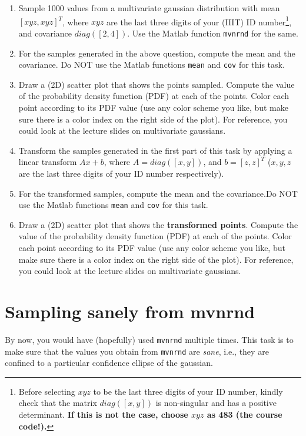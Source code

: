 \documentclass{article}
\begin{document}
\begin{enumerate}
\item Sample 1000 values from a multivariate gaussian distribution with mean $\left[xyz, xyz\right]^T$, where $xyz$ are the last three digits of your (IIIT) ID number\footnote{Before selecting $xyz$ to be the last three digits of your ID number, kindly check that the matrix $diag([x, y])$ is non-singular and has a positive determinant. \textbf{If this is not the case, choose $xyz$ as 483 (the course code!).}}, and covariance $diag([2, 4])$. Use the Matlab function \texttt{mvnrnd} for the same.
\item For the samples generated in the above question, compute the mean and the covariance. Do NOT use the Matlab functions \texttt{mean} and \texttt{cov} for this task.
\item Draw a (2D) scatter plot that shows the points sampled. Compute the value of the probability density function (PDF) at each of the points. Color each point according to its PDF value (use any color scheme you like, but make sure there is a color index on the right side of the plot). For reference, you could look at the lecture slides on multivariate gaussians.
\item Transform the samples generated in the first part of this task by applying a linear transform $Ax + b$, where $A = diag(\left[x, y\right])$, and $b = [z, z]^T$ ($x,y,z$ are the last three digits of your ID number respectively).
\item For the transformed samples, compute the mean and the covariance.Do NOT use the Matlab functions \texttt{mean} and \texttt{cov} for this task.
\item Draw a (2D) scatter plot that shows the \textbf{transformed points}. Compute the value of the probability density function (PDF) at each of the points. Color each point according to its PDF value (use any color scheme you like, but make sure there is a color index on the right side of the plot). For reference, you could look at the lecture slides on multivariate gaussians.
\end{enumerate}

\section{Sampling sanely from mvnrnd}

By now, you would have (hopefully) used \texttt{mvnrnd} multiple times. This task is to make sure that the values you obtain from \texttt{mvnrnd} are \emph{sane}, i.e., they are confined to a particular confidence ellipse of the gaussian.
\end{document}
